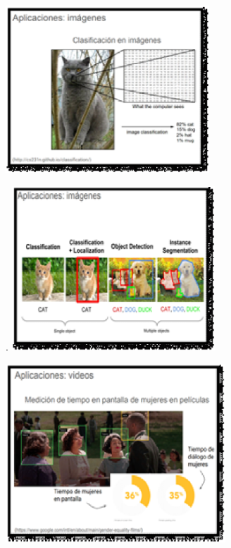 \documentclass{article} %
\begin{document}
\noindent 

\noindent \textbf{\includegraphics*[width=3.01in, height=2.47in, keepaspectratio=false]{image7}}

\noindent 

\noindent 

\noindent . \textbf{\includegraphics*[width=3.01in, height=2.43in, keepaspectratio=false]{image8}}

\noindent 

\noindent 

\noindent \includegraphics*[width=3.25in, height=2.64in, keepaspectratio=false]{image9}

\noindent 

\noindent 
\end{document}
